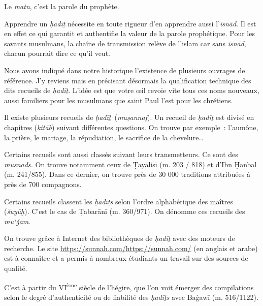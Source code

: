 Le \emph{matn}, c'est la parole du prophète.

Apprendre un \emph{ḥadīṯ} nécessite en toute rigueur d'en apprendre
aussi l'\emph{isnād}. Il est en effet ce qui garantit et authentifie la
valeur de la parole prophétique. Pour les savants musulmans, la chaîne
de transmission relève de l'islam car sans \emph{isnād}, chacun pourrait
dire ce qu'il veut.


Nous avons indiqué dans notre historique l'existence de plusieurs
ouvrages de référence. J'y reviens mais en précisant désormais la
qualification technique des dits recueils de \emph{ḥadīṯ}. L'idée est
que votre œil revoie vite tous ces noms nouveaux, aussi familiers pour
les musulmans que saint Paul l'est pour les chrétiens.

Il existe plusieurs recueils de \emph{ḥadīṯ}~(\emph{muṣannaf}). Un
recueil de \emph{ḥadīṯ} est divisé en chapitres (\emph{kitāb}) suivant
différentes questions. On trouve par exemple~: l'aumône, la prière, le
mariage, la répudiation, le sacrifice de la chevelure\ldots{}

Certains recueils sont aussi classés suivant leurs transmetteurs. Ce
sont des \emph{musnads.} On trouve notamment ceux de Ṭayālisī (m. 203 /
818) et d'Ibn Ḥanbal \label{Theol:IbnHanbal1} (m. 241/855). Dans ce dernier, on trouve près de 30
000 traditions attribuées à près de 700 compagnons.

Certains recueils classent les \emph{ḥadīṯs} selon l'ordre alphabétique
des maîtres (\emph{šuyūḫ}). C'est le cas de Ṭabarānī (m. 360/971). On
dénomme ces recueils des \emph{mu`ǧam}.

On trouve grâce à Internet des bibliothèques de \emph{ḥadīṯ} avec des
moteurs de recherche. Le site
\url{https://sunnah.com/}{\underline{https://sunnah.com/}} (en anglais
et arabe) est à connaître et a permis à nombreux étudiants un travail
sur des sources de qualité.

C'est à partir du VI\textsuperscript{ème} siècle de l'hégire, que l'on
voit émerger des compilations selon le degré d'authenticité ou de
fiabilité des \emph{ḥadīṯs} avec Baġawī (m. 516/1122).

